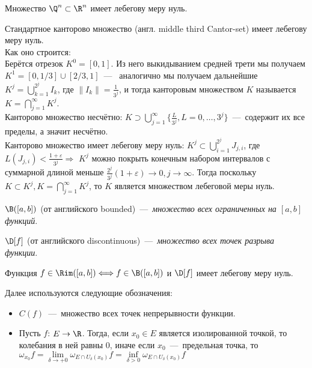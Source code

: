 \begin{example}
    Множество $\Q^n \subset \R^n$ имеет лебегову меру нуль.
\end{example}

\begin{example}
    Стандартное канторово множество (англ. middle third Cantor-set) имеет лебегову меру нуль. \\ Как оно строится: \\
    Берётся отрезок $K^0 = [0, 1]$. Из него выкидыванием средней трети мы получаем $K^1 = [0, 1/3] \cup [2/3, 1]$~---~ аналогично мы получаем дальнейшие $K^j = \bigcup\limits_{k = 1}^{2^j} I_k$, где $\|I_k\| = \frac{1}{3^j}$, и тогда канторовым множеством $K$ называется $K = \bigcap\limits_{j = 1}^\infty K^j$. \\
    Канторово множество несчётно: $K \supset \bigcup\limits_{j = 1}^{\infty} \{\frac{L}{3^j}, L = 0, \ldots, 3^j\}$~---~содержит их все пределы, а значит несчётно. \\
    Канторово множество имеет лебегову меру нуль: $K^j \subset \bigcup\limits_{i = 1}^{2^j} J_{j, i}$, где $L(J_{j, i}) < \frac{1 + \varepsilon}{3^j} \Rightarrow$ $K^j$ можно покрыть конечным набором интервалов с суммарной длиной меньше $\frac{2^j}{3^j}(1 + \varepsilon) \rightarrow 0, j \rightarrow \infty$. Тогда поскольку $K \subset K^j, K = \bigcap\limits_{j = 1}^\infty K^j$, то $K$ является множеством лебеговой меры нуль.
\end{example}

\begin{definition}
    $\B ([a, b])$ (от английского bounded)~---~\textit{множество всех ограниченных на $[a, b]$ функций}.
\end{definition}

\begin{definition}
    $\D[f]$ (от английского discontinuous)~---~\textit{множество всех точек разрыва функции}.
\end{definition}

\begin{theorem}
    Функция $f \in \Rim ([a, b]) \Longleftrightarrow f \in \B ([a, b])$ и $\D[f]$ имеет лебегову меру нуль.
\end{theorem}

\begin{note}
    Далее используются следующие обозначения:
    \begin{itemize}
        \item $C(f)$~---~множество всех точек непрерывности функции.
        \item Пусть $f$: $E \rightarrow \R$. Тогда, если $x_0 \in E$ является изолированной точкой, то колебания в ней равны 0, иначе если $x_0$~---~предельная точка, то $\omega_{x_0}f = \lim\limits_{\delta \rightarrow +0} \omega_{E \cap U_\delta(x_0)}f = \inf\limits_{\delta > 0} \omega_{E \cap U_\delta(x_0)}f$
    \end{itemize}
\end{note}

